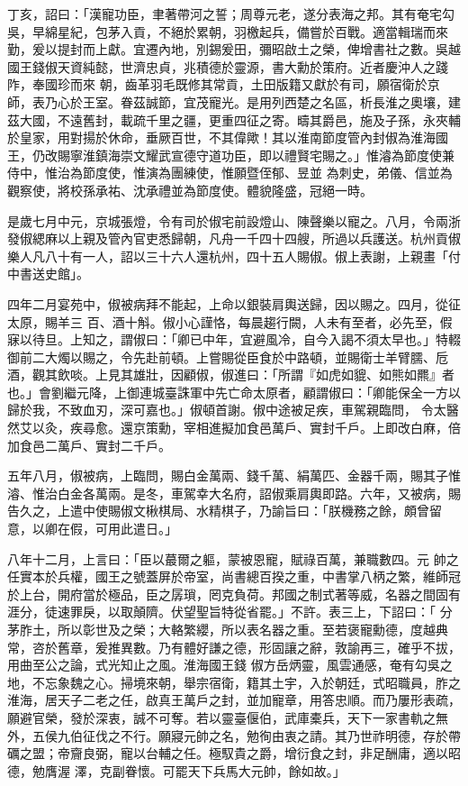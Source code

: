 \begin{pinyinscope}
 丁亥，詔曰：「漢寵功臣，聿著帶河之誓；周尊元老，遂分表海之邦。其有奄宅勾吳，早綿星紀，包茅入貢，不絕於累朝，羽檄起兵，備嘗於百戰。適當輯瑞而來勤，爰以提封而上獻。宜遷內地，別錫爰田，彌昭啟土之榮，俾增書社之數。吳越國王錢俶天資純懿，世濟忠貞，兆積德於靈源，書大勳於策府。近者慶沖人之踐阼，奉國珍而來
 朝，齒革羽毛既修其常貢，土田版籍又獻於有司，願宿衛於京師，表乃心於王室。眷茲誠節，宜茂寵光。是用列西楚之名區，析長淮之奧壤，建茲大國，不遠舊封，載疏千里之疆，更重四征之寄。疇其爵邑，施及子孫，永夾輔於皇家，用對揚於休命，垂厥百世，不其偉歟！其以淮南節度管內封俶為淮海國王，仍改賜寧淮鎮海崇文耀武宣德守道功臣，即以禮賢宅賜之。」惟濬為節度使兼侍中，惟治為節度使，惟演為團練使，惟願暨侄郁、昱並
 為刺史，弟儀、信並為觀察使，將校孫承祐、沈承禮並為節度使。體貌隆盛，冠絕一時。



 是歲七月中元，京城張燈，令有司於俶宅前設燈山、陳聲樂以寵之。八月，令兩浙發俶緦麻以上親及管內官吏悉歸朝，凡舟一千四十四艘，所過以兵護送。杭州貢俶樂人凡八十有一人，詔以三十六人還杭州，四十五人賜俶。俶上表謝，上親畫「付中書送史館」。



 四年二月宴苑中，俶被病拜不能起，上命以銀裝肩輿送歸，因以賜之。四月，從征太原，賜羊三
 百、酒十斛。俶小心謹恪，每晨趨行闕，人未有至者，必先至，假寐以待旦。上知之，謂俶曰：「卿已中年，宜避風冷，自今入謁不須太早也。」特輟御前二大燭以賜之，令先赴前頓。上嘗賜從臣食於中路頓，並賜衛士羊臂臑、卮酒，觀其飲啖。上見其雄壯，因顧俶，俶進曰：「所謂『如虎如貔、如熊如羆』者也。」會劉繼元降，上御連城臺誅軍中先亡命太原者，顧謂俶曰：「卿能保全一方以歸於我，不致血刃，深可嘉也。」俶頓首謝。俶中途被足疾，車駕親臨問，
 令太醫然艾以灸，疾尋愈。還京策勳，宰相進擬加食邑萬戶、實封千戶。上即改白麻，倍加食邑二萬戶、實封二千戶。



 五年八月，俶被病，上臨問，賜白金萬兩、錢千萬、絹萬匹、金器千兩，賜其子惟濬、惟治白金各萬兩。是冬，車駕幸大名府，詔俶乘肩輿即路。六年，又被病，賜告久之，上遣中使賜俶文楸棋局、水精棋子，乃諭旨曰：「朕機務之餘，頗曾留意，以卿在假，可用此遣日。」



 八年十二月，上言曰：「臣以蕞爾之軀，蒙被恩寵，賦祿百萬，兼職數四。元
 帥之任實本於兵權，國王之號蓋屏於帝室，尚書總百揆之重，中書掌八柄之繁，維師冠於上台，開府當於極品，臣之孱瑣，罔克負荷。邦國之制式著等威，名器之間固有涯分，徒速罪戾，以取顛隮。伏望聖旨特從省罷。」不許。表三上，下詔曰：「 分茅胙土，所以彰世及之榮；大輅繁纓，所以表名器之重。至若褒寵勳德，度越典常，咨於舊章，爰推異數。乃有體好謙之德，形固讓之辭，敦諭再三，確乎不拔，用曲至公之論，式光知止之風。淮海國王錢
 俶方岳炳靈，風雲通感，奄有勾吳之地，不忘象魏之心。掃境來朝，舉宗宿衛，籍其土宇，入於朝廷，式昭職員，胙之淮海，居天子二老之任，啟真王萬戶之封，並加寵章，用答忠順。而乃屢形表疏，願避官榮，發於深衷，誠不可奪。若以靈臺偃伯，武庫橐兵，天下一家書軌之無外，五侯九伯征伐之不行。願寢元帥之名，勉徇由衷之請。其乃世祚明德，存於帶礪之盟；帝齎良弼，寵以台輔之任。極馭貴之爵，增衍食之封，非足酬庸，適以昭德，勉膺渥
 澤，克副眷懷。可罷天下兵馬大元帥，餘如故。」




\end{pinyinscope}
